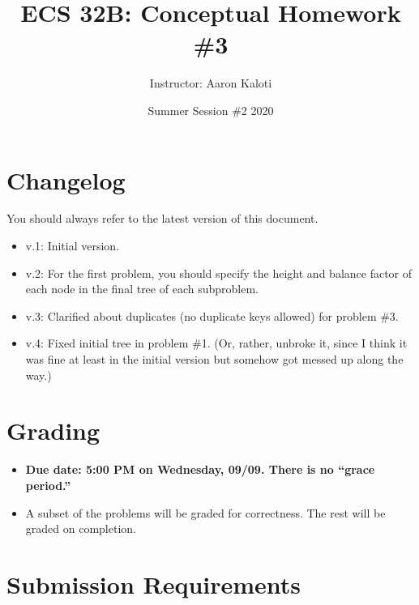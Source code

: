 \documentclass{article}
\title{ECS 32B: Conceptual Homework \#3}
\author{Instructor: Aaron Kaloti}
\date{Summer Session \#2 2020\blfootnote{This content is protected and may not be shared, uploaded, or distributed.}}
\begin{document}
\maketitle


\section{Changelog}

You should always refer to the latest version of this document.

\begin{itemize}[itemsep=0mm, parsep=0pt]
\item v.1: Initial version.
\item v.2: For the first problem, you should specify the height and balance factor of each node in the final tree of each subproblem.
\item v.3: Clarified about duplicates (no duplicate keys allowed) for problem \#3.
\item v.4: Fixed initial tree in problem \#1. (Or, rather, unbroke it, since I think it was fine at least in the initial version but somehow got messed up along the way.)
\end{itemize}

\section{Grading}

\begin{itemize}[itemsep=0mm, parsep=0pt]
\item \textbf{Due date: 5:00 PM on Wednesday, 09/09. There is no ``grace period.''}
\item A subset of the problems will be graded for correctness. The rest will be graded on completion.
\end{itemize}

\section{Submission Requirements}
\end{document}
